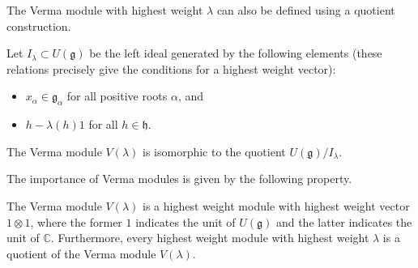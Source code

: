     The Verma module with highest weight $\lambda$ can also be defined using a quotient construction.
    \begin{adefinition}
        Let $I_\lambda\subset U(\mathfrak{g})$ be the left ideal generated by the following elements (these relations precisely give the conditions for a highest weight vector):
        \begin{itemize}
            \item $x_\alpha\in\mathfrak{g_\alpha}$ for all positive roots $\alpha$, and
            \item $h-\lambda(h)1$ for all $h\in\mathfrak{h}$.
        \end{itemize}
        The Verma module $V(\lambda)$ is isomorphic to the quotient $U(\mathfrak{g})/I_\lambda$.
    \end{adefinition}

    The importance of Verma modules is given by the following property.
    \begin{property}
        The Verma module $V(\lambda)$ is a highest weight module with highest weight vector $1\otimes1$, where the former $1$ indicates the unit of $U(\mathfrak{g})$ and the latter indicates the unit of $\mathbb{C}$. Furthermore, every highest weight module with highest weight $\lambda$ is a quotient of the Verma module $V(\lambda)$.
    \end{property}

